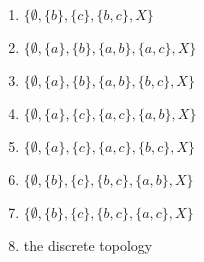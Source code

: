 \begin{multicols}{2}
\begin{enumerate}[1.]
\item $\{\emptyset, \{b\}, \{c\}, \{b,c\}, X\}$

\item $\{\emptyset, \{a\}, \{b\}, \{a,b\}, \{a,c\}, X\}$

\item $\{\emptyset, \{a\}, \{b\}, \{a,b\}, \{b,c\}, X\}$

\item $\{\emptyset, \{a\}, \{c\}, \{a,c\}, \{a,b\}, X\}$

\item $\{\emptyset, \{a\}, \{c\}, \{a,c\}, \{b,c\}, X\}$

\item $\{\emptyset, \{b\}, \{c\}, \{b,c\}, \{a,b\}, X\}$

\item $\{\emptyset, \{b\}, \{c\}, \{b,c\}, \{a,c\}, X\}$

\item the discrete topology

\end{enumerate}

\end{multicols}

